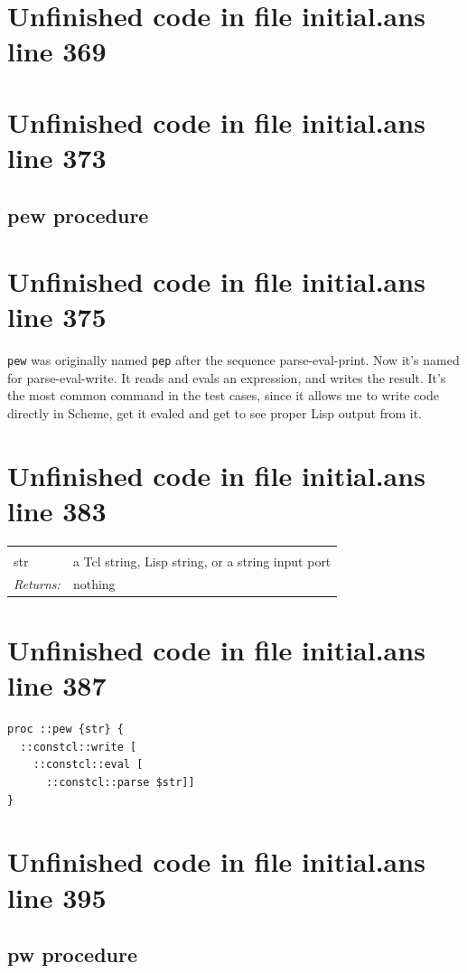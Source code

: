 \documentclass[twoside,9pt]{report}
\begin{document}
\section{Unfinished code in file initial.ans line 369}
\section{Unfinished code in file initial.ans line 373}
\subsection{pew procedure}
\label{pew-procedure}
\section{Unfinished code in file initial.ans line 375}


\texttt{pew} was originally named \texttt{pep} after the sequence parse-eval-print. Now it's named for parse-eval-write. It reads and evals an expression, and writes the result. It's the most common command in the test cases, since it allows me to write code directly in Scheme, get it evaled and get to see proper Lisp output from it.

\section{Unfinished code in file initial.ans line 383}
\noindent\begin{tabular}{ |p{1.9cm} p{8cm}| }
\hline
\rowcolor[HTML]{CCCCCC} \multicolumn{2}{|l|}{\bf pew (internal)} \\
str & a Tcl string, Lisp string, or a string input port \\
\textit{Returns:} & nothing \\
\hline
\end{tabular}
\section{Unfinished code in file initial.ans line 387}
\begin{lstlisting}
proc ::pew {str} {
  ::constcl::write [
    ::constcl::eval [
      ::constcl::parse $str]]
}
\end{lstlisting}
\section{Unfinished code in file initial.ans line 395}
\subsection{pw procedure}
\label{pw-procedure}
\end{document}
